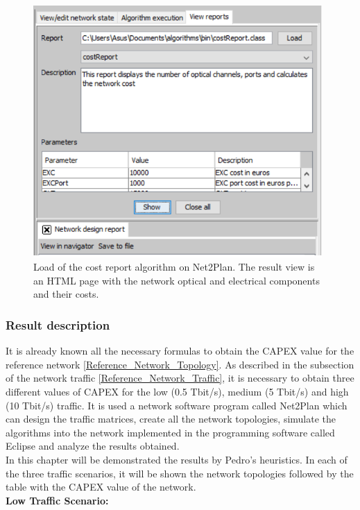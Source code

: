 \begin{figure}[H]
\centering
\includegraphics[width=11cm]{sdf/heuristic/translucent_survivability/figures/cost_report_translucent}
\caption{Load of the cost report algorithm on Net2Plan. The result view is an HTML page with the network optical and electrical components and their costs.}
\label{cost_report_translucent}
\end{figure}

\subsubsection{Result description}\label{result_description_translucent_heuristic_surv}

It is already known all the necessary formulas to obtain the CAPEX value for the reference network \ref{Reference_Network_Topology}. As described in the subsection of the network traffic \ref{Reference_Network_Traffic}, it is necessary to obtain three different values of CAPEX for the low (0.5 Tbit/s), medium (5 Tbit/s) and high (10 Tbit/s) traffic. It is used a network software program called Net2Plan which can design the traffic matrices, create all the network topologies, simulate the algorithms into the network implemented in the programming software called Eclipse and analyze the results obtained.\\
In this chapter will be demonstrated the results by Pedro's heuristics. In each of the three traffic scenarios, it will be shown the network topologies followed by the table with the CAPEX value of the network.\\

\noindent
\textbf{Low Traffic Scenario:}\\

